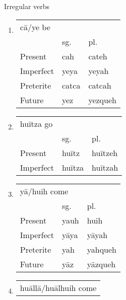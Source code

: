 \documentclass[12pt]{beamer}
\newcommand{\nah}[1]{\textcolor{nahgrn}{#1}}
\newcommand{\trs}[1]{\textcolor{nahblu}{#1}}
\begin{document}
\begin{frame}
\begin{columns}[t]
\begin{column}{.18\linewidth}
      \begin{block}{Irregular verbs}
        \begin{enumerate}
          \item \begin{tabular}[t]{lll}
                  \multicolumn{3}{l}{\nah{cā/ye} \trs{be}} \\
                            & sg.         & pl.            \\
                  Present   & \nah{cah}   & \nah{cateh}    \\
                  Imperfect & \nah{yeya}  & \nah{yeyah}    \\
                  Preterite & \nah{catca} & \nah{catcah}   \\
                  Future    & \nah{yez}   & \nah{yezqueh}  \\
                \end{tabular}%
          \item \begin{tabular}[t]{lll}
                  \multicolumn{3}{l}{\nah{huītza} \trs{go}} \\
                            & sg.          & pl.            \\
                  Present   & \nah{huītz}  & \nah{huītzeh}  \\
                  Imperfect & \nah{huītza} & \nah{huītzah}  \\
                \end{tabular}%
          \item \begin{tabular}[t]{lll}
                  \multicolumn{3}{l}{\nah{yā/huih} \trs{come}} \\
                            & sg.        & pl.                 \\
                  Present   & \nah{yauh} & \nah{huih}          \\
                  Imperfect & \nah{yāya} & \nah{yāyah}         \\
                  Preterite & \nah{yah}  & \nah{yahqueh}       \\
                  Future    & \nah{yāz}  & \nah{yāzqueh}       \\
                \end{tabular}%
          \item \begin{tabular}[t]{lll}
                  \multicolumn{3}{l}{\nah{huāllā/huālhuih} \trs{come}} \\

\end{tabular}
\end{enumerate}
\end{block}
\end{column}
\end{columns}
\end{frame}
\end{document}
